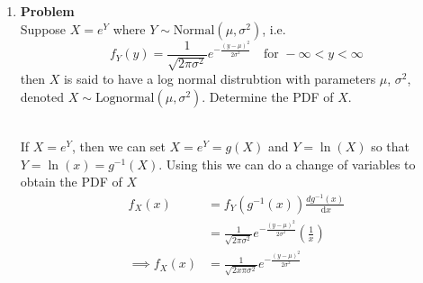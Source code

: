 \documentclass[12pt]{article}
\newenvironment{Ex}{\textbf{Problem}\vspace{.75em}\\}{}
\newcommand{\dd}[1]{\:\mathrm{d}{#1}}
\begin{document}
\begin{enumerate}
\begin{Ex}
\begin{solution}
\begin{enumerate}
\begin{equation}
          \label{eq:4c-bayes-rule}
          P(A_i|B) = \frac{P(A_i)P(B|A_i)}{P(A_1)P(B|A_1) + \cdots +
            P(A_n)P(B|A_n)}
        \end{equation}
        Using this definition, we can define the probability that
        clerk $i$ served the customer given that $T>5$ as the
        following
        \begin{equation}
          \label{eq:4c-bayes-plug}
          \implies P(I=i|T>5) =
          \frac{p_i\int_5^{\infty}\alpha_ie^{-\alpha_i t}
            \dd{t}}{\sum_{j=1}^{n}p_j\int_5^{\infty}\alpha_je^{-\alpha_j
              t} \dd{t}}
        \end{equation}
      \end{enumerate}
    \end{solution}
  \end{Ex}
\item
  \begin{Ex}
    Suppose $X = e^Y$ where $Y\sim \text{Normal}(\mu, \sigma^2)$, i.e.
    \begin{equation}
      \label{eq:5-question}
      f_Y(y) =
      \frac{1}{\sqrt{2\pi\sigma^2}}e^{-\frac{(y-\mu)^2}{2\sigma^2}}
      \quad\text{for }-\infty < y < \infty
    \end{equation}
    then $X$ is said to have a log normal distrubtion with parameters
    $\mu$, $\sigma^2$, denoted $X \sim
    \text{Lognormal}(\mu,\sigma^2)$. Determine the PDF of $X$.
    \begin{solution} \hfill \vspace{.75em} \\
      If $X = e^Y$, then we can set $X = e^Y = g(X)$ and $Y=\ln(X)$ so
      that $Y = \ln(x) = g^{-1}(X)$. Using this we can do a change of
      variables to obtain the PDF of $X$
      \begin{equation}
        \label{eq:5-sol}
        \begin{aligned}
          f_{X}(x) &= f_{Y}(g^{-1}(x)) \frac{d g^{-1}(x)}{\dd{x}} \\
          &=
          \frac{1}{\sqrt{2\pi\sigma^2}}e^{-\frac{(y-\mu)^2}{2\sigma^2}}
          \left(\frac{1}{x}\right) \\
          \implies f_{X}(x) &=
          \frac{1}{\sqrt{2x\pi\sigma^2}}e^{-\frac{(y-\mu)^2}{2\sigma^2}}
          \\
        \end{aligned}
      \end{equation}
    \end{solution}
  \end{Ex}

\end{enumerate}
\end{document}
